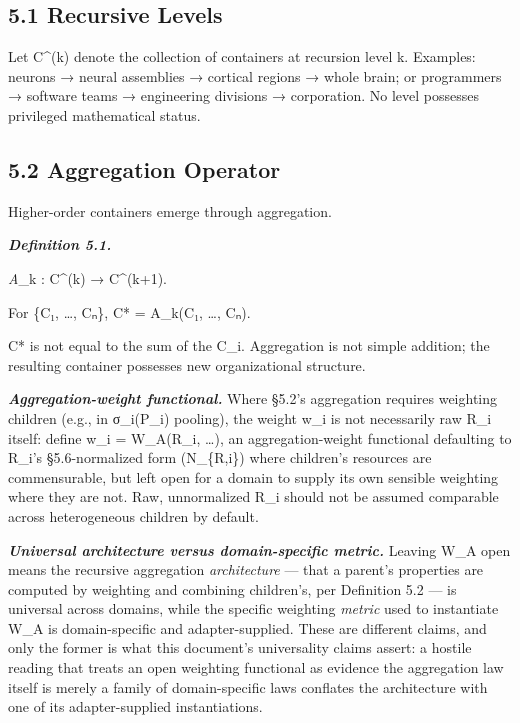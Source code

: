 \documentclass[
]{article}
\begin{document}
\hypertarget{recursive-levels}{%
\subsection{5.1 Recursive Levels}\label{recursive-levels}}

Let C\^{}(k) denote the collection of containers at recursion level k.
Examples: neurons → neural assemblies → cortical regions → whole brain;
or programmers → software teams → engineering divisions → corporation.
No level possesses privileged mathematical status.

\hypertarget{aggregation-operator}{%
\subsection{5.2 Aggregation Operator}\label{aggregation-operator}}

Higher-order containers emerge through aggregation.

\emph{\textbf{Definition 5.1.}}

\emph{A}\_k : C\^{}(k) → C\^{}(k+1).

For \{C₁, \ldots, Cₙ\}, C* = A\_k(C₁, \ldots, Cₙ).

C* is not equal to the sum of the C\_i. Aggregation is not simple
addition; the resulting container possesses new organizational
structure.

\emph{\textbf{Aggregation-weight functional.}} Where §5.2's aggregation
requires weighting children (e.g., in σ\_i(P\_i) pooling), the weight
w\_i is not necessarily raw R\_i itself: define w\_i = W\_A(R\_i,
\ldots), an aggregation-weight functional defaulting to R\_i's
§5.6-normalized form (N\_\{R,i\}) where children's resources are
commensurable, but left open for a domain to supply its own sensible
weighting where they are not. Raw, unnormalized R\_i should not be
assumed comparable across heterogeneous children by default.

\emph{\textbf{Universal architecture versus domain-specific metric.}}
Leaving W\_A open means the recursive aggregation \emph{architecture}
--- that a parent's properties are computed by weighting and combining
children's, per Definition 5.2 --- is universal across domains, while
the specific weighting \emph{metric} used to instantiate W\_A is
domain-specific and adapter-supplied. These are different claims, and
only the former is what this document's universality claims assert: a
hostile reading that treats an open weighting functional as evidence the
aggregation law itself is merely a family of domain-specific laws
conflates the architecture with one of its adapter-supplied
instantiations.
\end{document}
